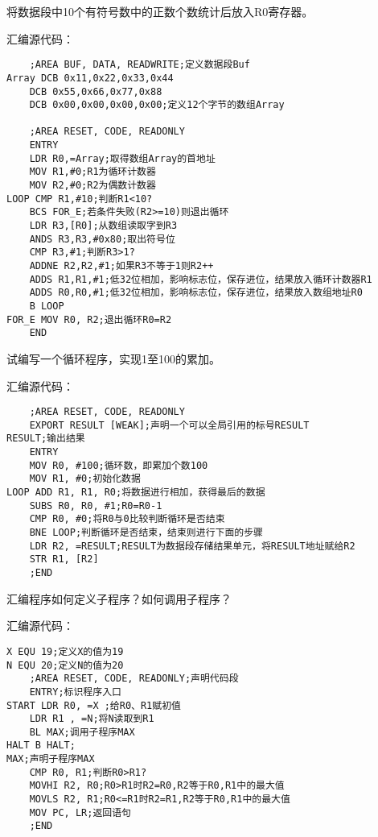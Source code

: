 \documentclass[11pt,letter,notitlepage,UTF8]{ctexart}
\begin{document}
\begin{exercise}[7.5]
	将数据段中10个有符号数中的正数个数统计后放入R0寄存器。	
\end{exercise}
\begin{solution}
汇编源代码：
\begin{lstlisting}
	;AREA BUF, DATA, READWRITE;定义数据段Buf
Array DCB 0x11,0x22,0x33,0x44
	DCB 0x55,0x66,0x77,0x88
	DCB 0x00,0x00,0x00,0x00;定义12个字节的数组Array

	;AREA RESET, CODE, READONLY
	ENTRY
	LDR R0,=Array;取得数组Array的首地址
	MOV R1,#0;R1为循环计数器
	MOV R2,#0;R2为偶数计数器
LOOP CMP R1,#10;判断R1<10?
	BCS FOR_E;若条件失败(R2>=10)则退出循环
	LDR R3,[R0];从数组读取字到R3
	ANDS R3,R3,#0x80;取出符号位
	CMP R3,#1;判断R3>1?
	ADDNE R2,R2,#1;如果R3不等于1则R2++
	ADDS R1,R1,#1;低32位相加，影响标志位，保存进位，结果放入循环计数器R1
	ADDS R0,R0,#1;低32位相加，影响标志位，保存进位，结果放入数组地址R0
	B LOOP
FOR_E MOV R0, R2;退出循环R0=R2
	END

\end{lstlisting}
\end{solution}

\begin{exercise}[7.6]
	试编写一个循环程序，实现1至100的累加。	
\end{exercise}
\begin{solution}
汇编源代码：
\begin{lstlisting}
	;AREA RESET, CODE, READONLY
	EXPORT RESULT [WEAK];声明一个可以全局引用的标号RESULT
RESULT;输出结果
	ENTRY
	MOV R0, #100;循环数，即累加个数100
	MOV R1, #0;初始化数据
LOOP ADD R1, R1, R0;将数据进行相加，获得最后的数据
	SUBS R0, R0, #1;R0=R0-1
	CMP R0, #0;将R0与0比较判断循环是否结束
	BNE LOOP;判断循环是否结束，结束则进行下面的步骤
	LDR R2, =RESULT;RESULT为数据段存储结果单元，将RESULT地址赋给R2
	STR R1, [R2]
	;END

\end{lstlisting}
\end{solution}

\begin{exercise}[7.7]
	汇编程序如何定义子程序？如何调用子程序？	
\end{exercise}
\begin{solution}
汇编源代码：
\begin{lstlisting}
X EQU 19;定义X的值为19
N EQU 20;定义N的值为20
	;AREA RESET, CODE, READONLY;声明代码段
	ENTRY;标识程序入口
START LDR R0, =X ;给R0、R1赋初值
	LDR R1 , =N;将N读取到R1
	BL MAX;调用子程序MAX
HALT B HALT;
MAX;声明子程序MAX
	CMP R0, R1;判断R0>R1?
	MOVHI R2, R0;R0>R1时R2=R0,R2等于R0,R1中的最大值
	MOVLS R2, R1;R0<=R1时R2=R1,R2等于R0,R1中的最大值
	MOV PC, LR;返回语句
	;END

\end{lstlisting}
\end{solution}
\end{document}
